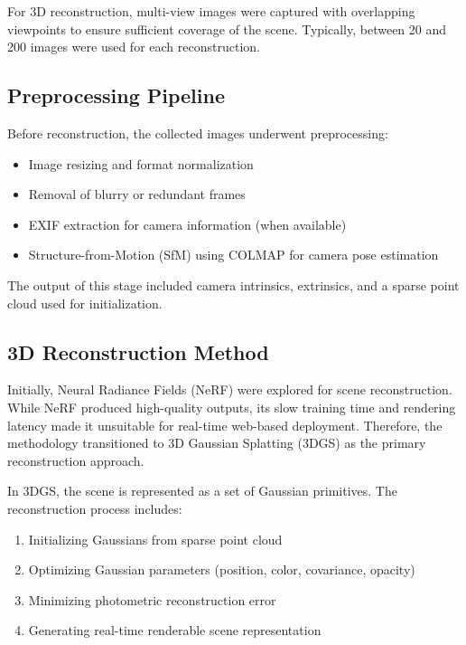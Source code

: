 For 3D reconstruction, multi-view images were captured with overlapping viewpoints to ensure sufficient coverage of the scene. Typically, between 20 and 200 images were used for each reconstruction.

\subsection{Preprocessing Pipeline}

Before reconstruction, the collected images underwent preprocessing:

\begin{itemize}
    \item Image resizing and format normalization
    \item Removal of blurry or redundant frames
    \item EXIF extraction for camera information (when available)
    \item Structure-from-Motion (SfM) using COLMAP for camera pose estimation
\end{itemize}

The output of this stage included camera intrinsics, extrinsics, and a sparse point cloud used for initialization.

\subsection{3D Reconstruction Method}

Initially, Neural Radiance Fields (NeRF) were explored for scene reconstruction. While NeRF produced high-quality outputs, its slow training time and rendering latency made it unsuitable for real-time web-based deployment. Therefore, the methodology transitioned to 3D Gaussian Splatting (3DGS) as the primary reconstruction approach.

In 3DGS, the scene is represented as a set of Gaussian primitives. The reconstruction process includes:

\begin{enumerate}
    \item Initializing Gaussians from sparse point cloud
    \item Optimizing Gaussian parameters (position, color, covariance, opacity)
    \item Minimizing photometric reconstruction error
    \item Generating real-time renderable scene representation
\end{enumerate}

